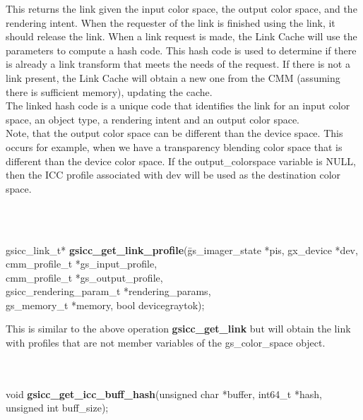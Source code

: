 \documentclass[12pt,notitlepage]{article}
\begin{document}
\begin{minipage}[h]{6.0in}
This returns the link given the input color space, the output color space, and the rendering intent.   When the requester of the link is finished using the link, it should release the link.  When a link request is made, the Link Cache will use the parameters to compute a hash code.  This hash code is used to determine if there is already a link transform that meets the needs of the request.  If there is not a link present, the Link Cache will obtain a new one from the CMM (assuming there is sufficient memory), updating the cache.\\

The linked hash code is a unique code that identifies the link for an input color space, an object type, a rendering intent and an output color space.\\

Note, that the output color space can be different than the device space.  This occurs for example, when we have a transparency blending color space that is different than the device color space.  If the output\_colorspace variable is NULL, then the ICC profile associated with dev will be used as the destination color space.
\end{minipage}\\
\\

\begin{tabbing}
\noindent gsicc\_link\_t* {\bf gsicc\_get\_link\_profile}(\=gs\_imager\_state *pis, gx\_device *dev,\\
\> cmm\_profile\_t *gs\_input\_profile, \\
\> cmm\_profile\_t *gs\_output\_profile, \\
\> gsicc\_rendering\_param\_t *rendering\_params,\\
\> gs\_memory\_t *memory, bool devicegraytok);\\
\end{tabbing}

\begin{minipage}[h]{6.0in}
This is similar to the above operation {\bf gsicc\_get\_link} but will obtain the link with profiles that are not member variables of the gs\_color\_space object.
\end{minipage}\\
\\

\noindent void {\bf gsicc\_get\_icc\_buff\_hash}(unsigned char *buffer, int64\_t *hash, unsigned int buff\_size);\\
\end{document}
